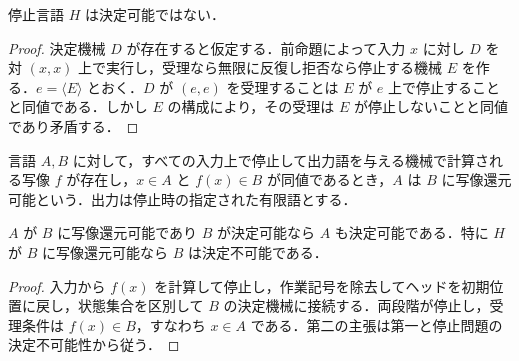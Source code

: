 \begin{prop}[停止問題の決定不可能性]
停止言語 $H$ は決定可能ではない．
\end{prop}
\begin{proof}
決定機械 $D$ が存在すると仮定する．前命題によって入力 $x$ に対し $D$ を対 $(x,x)$ 上で実行し，受理なら無限に反復し拒否なら停止する機械 $E$ を作る．$e=\langle E\rangle$ とおく．$D$ が $(e,e)$ を受理することは $E$ が $e$ 上で停止することと同値である．しかし $E$ の構成により，その受理は $E$ が停止しないことと同値であり矛盾する．
\end{proof}
\begin{defn}[写像還元]
言語 $A,B$ に対して，すべての入力上で停止して出力語を与える機械で計算される写像 $f$ が存在し，$x\in A$ と $f(x)\in B$ が同値であるとき，$A$ は $B$ に写像還元可能という．出力は停止時の指定された有限語とする．
\end{defn}
\begin{prop}[決定可能性の還元による保存]
$A$ が $B$ に写像還元可能であり $B$ が決定可能なら $A$ も決定可能である．特に $H$ が $B$ に写像還元可能なら $B$ は決定不可能である．
\end{prop}
\begin{proof}
入力から $f(x)$ を計算して停止し，作業記号を除去してヘッドを初期位置に戻し，状態集合を区別して $B$ の決定機械に接続する．両段階が停止し，受理条件は $f(x)\in B$，すなわち $x\in A$ である．第二の主張は第一と停止問題の決定不可能性から従う．
\end{proof}
